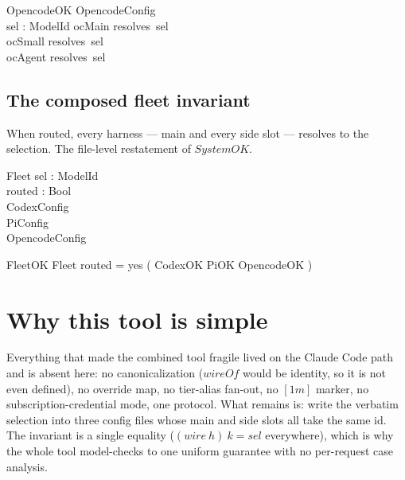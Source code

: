 \documentclass{article}
\begin{document}
\begin{schema}{OpencodeOK}
  OpencodeConfig \\
  sel : ModelId
\where
  ocMain \in resolves~sel \\
  ocSmall \in resolves~sel \\
  ocAgent \in resolves~sel
\end{schema}

\subsection{The composed fleet invariant}

When routed, every harness --- main and every side slot --- resolves to the
selection. The file-level restatement of $SystemOK$.

\begin{schema}{Fleet}
  sel : ModelId \\
  routed : Bool \\
  CodexConfig \\
  PiConfig \\
  OpencodeConfig
\end{schema}

\begin{schema}{FleetOK}
  Fleet
\where
  routed = yes \implies ( CodexOK \land PiOK \land OpencodeOK )
\end{schema}

\section{Why this tool is simple}

Everything that made the combined tool fragile lived on the Claude Code path and
is absent here: no canonicalization ($wireOf$ would be identity, so it is not
even defined), no override map, no tier-alias fan-out, no $[1m]$ marker, no
subscription-credential mode, one protocol. What remains is: write the verbatim
selection into three config files whose main and side slots all take the same
id. The invariant is a single equality ($(wire~h)~k = sel$ everywhere), which is
why the whole tool model-checks to one uniform guarantee with no per-request
case analysis.
\end{document}
